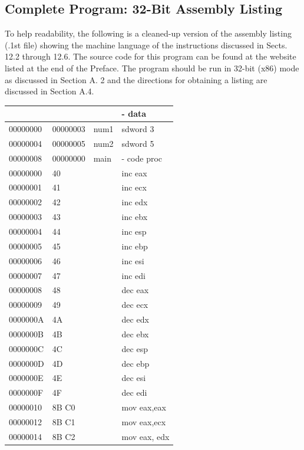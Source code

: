 \documentclass[10pt]{article}
\begin{document}
\subsection*{Complete Program: 32-Bit Assembly Listing}
To help readability, the following is a cleaned-up version of the assembly listing (.1st file) showing the machine language of the instructions discussed in Sects. 12.2 through 12.6. The source code for this program can be found at the website listed at the end of the Preface. The program should be run in 32-bit (x86) mode as discussed in Section A. 2 and the directions for obtaining a listing are discussed in Section A.4.

\begin{center}
\begin{tabular}{|l|l|l|l|}
\hline
 &  &  & - data \\
\hline
00000000 & 00000003 & num1 & sdword 3 \\
\hline
00000004 & 00000005 & num2 & sdword 5 \\
\hline
00000008 & 00000000 & main & - code proc \\
\hline
00000000 & 40 &  & inc eax \\
\hline
00000001 & 41 &  & inc ecx \\
\hline
00000002 & 42 &  & inc edx \\
\hline
00000003 & 43 &  & inc ebx \\
\hline
00000004 & 44 &  & inc esp \\
\hline
00000005 & 45 &  & inc ebp \\
\hline
00000006 & 46 &  & inc esi \\
\hline
00000007 & 47 &  & inc edi \\
\hline
00000008 & 48 &  & dec eax \\
\hline
00000009 & 49 &  & dec ecx \\
\hline
0000000A & 4A &  & dec edx \\
\hline
0000000B & 4B &  & dec ebx \\
\hline
0000000C & 4C &  & dec esp \\
\hline
0000000D & 4D &  & dec ebp \\
\hline
0000000E & 4E &  & dec esi \\
\hline
0000000F & 4F &  & dec edi \\
\hline
00000010 & 8B C0 &  & mov eax,eax \\
\hline
00000012 & 8B C1 &  & mov eax,ecx \\
\hline
00000014 & 8B C2 &  & mov eax, edx \\

\end{tabular}
\end{center}
\end{document}
